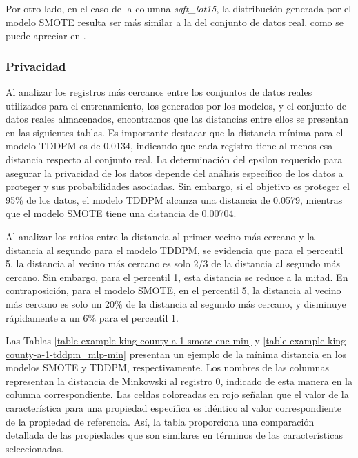

\newpage
Por otro lado, en el caso de la columna \emph{sqft\_lot15}, la distribución generada por el modelo SMOTE resulta ser más similar a la del conjunto de datos real, como se puede apreciar en .




\newpage
\subsubsection{Privacidad}
Al analizar los registros más cercanos entre los conjuntos de datos reales utilizados para el entrenamiento, los generados por los modelos, y el conjunto de datos reales almacenados, encontramos que las distancias entre ellos se presentan en las siguientes tablas. Es importante destacar que la distancia mínima para el modelo TDDPM es de 0.0134, indicando que cada registro tiene al menos esa distancia respecto al conjunto real. La determinación del epsilon requerido para asegurar la privacidad de los datos depende del análisis específico de los datos a proteger y sus probabilidades asociadas. Sin embargo, si el objetivo es proteger el 95\% de los datos, el modelo TDDPM alcanza una distancia de 0.0579, mientras que el modelo SMOTE tiene una distancia de 0.00704.





\newpage
Al analizar los ratios entre la distancia al primer vecino más cercano y la distancia al segundo para el modelo TDDPM, se evidencia que para el percentil 5, la distancia al vecino más cercano es solo 2/3 de la distancia al segundo más cercano. Sin embargo, para el percentil 1, esta distancia se reduce a la mitad. En contraposición, para el modelo SMOTE, en el percentil 5, la distancia al vecino más cercano es solo un 20\% de la distancia al segundo más cercano, y disminuye rápidamente a un 6\% para el percentil 1.




\newpage
Las Tablas \ref{table-example-king county-a-1-smote-enc-min} y \ref{table-example-king county-a-1-tddpm_mlp-min} presentan un ejemplo de la mínima distancia en los modelos SMOTE y TDDPM, respectivamente. Los nombres de las columnas representan la distancia de Minkowski al registro 0, indicado de esta manera en la columna correspondiente. Las celdas coloreadas en rojo señalan que el valor de la característica para una propiedad específica es idéntico al valor correspondiente de la propiedad de referencia. Así, la tabla proporciona una comparación detallada de las propiedades que son similares en términos de las características seleccionadas.

